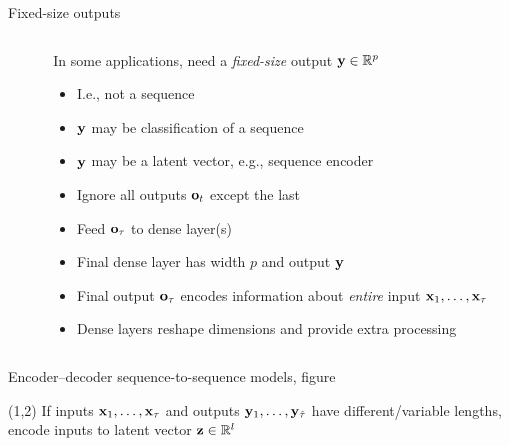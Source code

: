 \begin{frame}{Fixed-size outputs}
    \begin{columns}
        \begin{column}{0.37\textwidth}
        \end{column}
        \begin{column}{0.63\textwidth}
            In some \rnn{} applications, need a \emph{fixed-size} output $\mathbf{y} \in \mathbb{R}^p$
            \begin{itemize}
                \item<+-> I.e., not a sequence
                \item $\mathbf{y}$ may be classification of a sequence
                \item $\mathbf{y}$ may be a latent vector, e.g., sequence encoder
            \end{itemize}
            \begin{itemize}[<.->]
                \item Ignore all \rnn{} outputs $\mathbf{o}_t$ except the last
                \item Feed $\mathbf{o}_\tau$ to dense layer(s)
                \item Final dense layer has width $p$ and output $\mathbf{y}$
            \end{itemize}
            \begin{itemize}[<.->]
                \item Final output $\mathbf{o}_\tau$ encodes information about \emph{entire} input $\mathbf{x}_1, \ldots, \mathbf{x}_\tau$
                \item Dense layers reshape dimensions and provide extra processing
            \end{itemize}
        \end{column}
    \end{columns}
\end{frame}

\begin{frame}{Encoder--decoder sequence-to-sequence models, figure}
    \vspace{5mm}
    
    \vspace{-2.5mm}

    \begin{textblock}{9.5}(1,2)
        If inputs $\mathbf{x}_1, \dots, \mathbf{x}_\tau$ and outputs $\mathbf{y}_1, \dots, \mathbf{y}_{\hat{\tau}}$ have different/variable lengths, \alert{encode} inputs to latent vector $\mathbf{z} \in \mathbb{R}^l$
    \end{textblock}
\end{frame}


